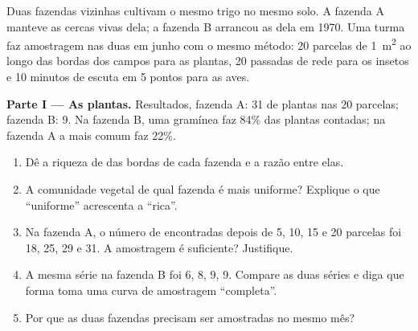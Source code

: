 \begin{problem}
\label{pb:g10:biodiversity-scales:1}
Duas fazendas vizinhas cultivam o mesmo trigo no mesmo solo. A fazenda
A manteve as cercas vivas dela; a fazenda B arrancou as dela em 1970.
Uma turma faz amostragem nas duas em junho com o mesmo método: 20
parcelas de \qty{1}{m^2} ao longo das bordas dos campos para as
plantas, 20 passadas de rede para os insetos e 10 minutos de escuta em
5 pontos para as aves.

\medskip
\noindent\textbf{Parte I --- As plantas.}
Resultados, fazenda A: 31  de plantas nas 20 parcelas; fazenda
B: 9. Na fazenda B, uma gramínea faz 84\% das plantas contadas; na
fazenda A a  mais comum faz 22\%.
\begin{enumerate}
  \item Dê a riqueza de  das bordas de cada fazenda e a razão
        entre elas.
  \item A comunidade vegetal de qual fazenda é mais uniforme? Explique
        o que ``uniforme'' acrescenta a ``rica''.
  \item Na fazenda A, o número de  encontradas depois de 5, 10,
        15 e 20 parcelas foi 18, 25, 29 e 31. A amostragem é
        suficiente? Justifique.
  \item A mesma série na fazenda B foi 6, 8, 9, 9. Compare as duas
        séries e diga que forma toma uma curva de amostragem
        ``completa''.
  \item Por que as duas fazendas precisam ser amostradas no mesmo mês?
\end{enumerate}


\end{problem}
